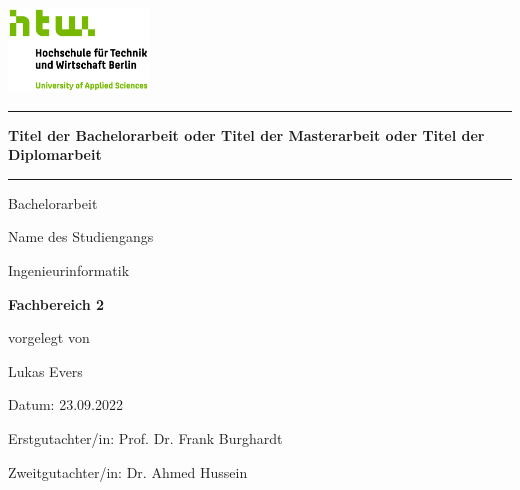 \begin{titlepage}

\begin{center}
\includegraphics[width=0.28\textwidth,keepaspectratio]{images/HTW_Logo_rgb.jpg}
\end{center}

\bigskip
\bigskip 
\bigskip 
\bigskip 

\par\noindent\rule{\textwidth}{0.4pt}

\bigskip 
\bigskip 
\bigskip 
 
\begin{center}
	\begin{Large}
		\color{htwgreen}
		\textbf{Titel der Bachelorarbeit oder Titel der Masterarbeit oder Titel der Diplomarbeit}
	\end{Large}
	
	\bigskip 
	\bigskip 
	\par\noindent\rule{\textwidth}{0.4pt}
	
	\medskip 
	Bachelorarbeit
	\bigskip 
	\bigskip
	\bigskip 
	\bigskip 
	\bigskip 
	\bigskip
	\bigskip 
	\bigskip 

	\bigskip 
	Name des Studiengangs\\
	
	\medskip
	\begin{Large}
		Ingenieurinformatik
	\end{Large}
	
	\bigskip 
	\begin{Large}
		\color{htwgreen}
		\textbf{Fachbereich 2}
	\end{Large}

	\bigskip 
	vorgelegt von \\
		
	\begin{Large}
		Lukas Evers\\
		
	\end{Large}
	
	\bigskip 
	\bigskip 
	\bigskip 
	\bigskip 
	\bigskip 
	\bigskip 
	\bigskip 
	\bigskip 
	\bigskip 
	\bigskip 
	\bigskip 
	\bigskip 
	
	\bigskip 
	\bigskip 
	\bigskip 
	
	\bigskip 
	\bigskip 
	\bigskip 
	\bigskip 
	\bigskip
	Datum:
	23.09.2022\\
	\bigskip
	
	\begin{Large}
		Erstgutachter/in: Prof. Dr. Frank Burghardt \\
		
	\end{Large}
	
	\begin{Large}
		Zweitgutachter/in: Dr. Ahmed Hussein \\
		
	\end{Large}


\end{center}

\end{titlepage}
